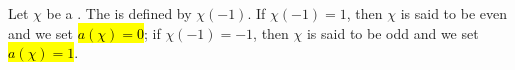 \begin{definition} \label{definition:parity_of_a_dirichlet_character}
Let $\chi$ be a . The  is defined by $\chi(-1)$. If $\chi(-1) = 1$, then $\chi$ is said to be even and we set \hl{$a(\chi) = 0$}; if $\chi(-1) = -1$, then $\chi$ is said to be odd and we set \hl{$a(\chi) = 1$}.
\end{definition}